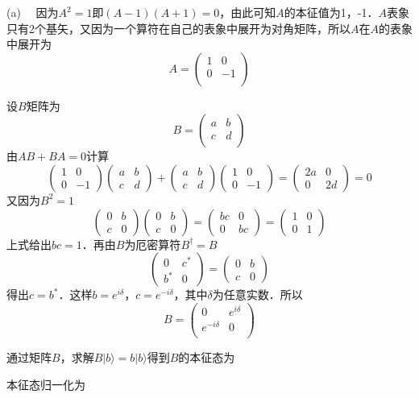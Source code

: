 (a) \ \ 因为$A^2=1$即$(A-1)(A+1)=0$，由此可知$A$的本征值为1，-1．$A$表象只有2个基矢，又因为一个算符在自己的表象中展开为对角矩阵，所以$A$在$A$的表象中展开为
$$
A=\left( \begin{matrix}
	1&		0\\
	0&		-1\\
\end{matrix} \right) 
$$

设$B$矩阵为
$$
B=\left( \begin{matrix}
	a&		b\\
	c&		d\\
\end{matrix} \right) 
$$
由$AB+BA=0$计算
$$
\left(\begin{array}{cc}
1 & 0 \\
0 & -1
\end{array}\right)\left(\begin{array}{ll}
a & b \\
c & d
\end{array}\right)+\left(\begin{array}{ll}
a & b \\
c & d
\end{array}\right)\left(\begin{array}{cc}
1 & 0 \\
0 & -1
\end{array}\right)=\left(\begin{array}{cc}
2 a & 0 \\
0 & 2 d
\end{array}\right)=0
$$
又因为$B^2=1$
$$
\left(\begin{array}{ll}
0 & b \\
c & 0
\end{array}\right)\left(\begin{array}{ll}
0 & b \\
c & 0
\end{array}\right)=\left(\begin{array}{ll}
b c & 0 \\
0 & b c
\end{array}\right)=\left(\begin{array}{ll}
1 & 0 \\
0 & 1
\end{array}\right)$$
上式给出$bc=1$．再由$B$为厄密算符$B^\dagger=B$
$$
\left(\begin{array}{ll}
0 & c^* \\
b^* & 0
\end{array}\right)=\left(\begin{array}{ll}
0 & b \\
c & 0
\end{array}\right)
$$
得出$c=b^*$．这样$b=e^{i\delta}$，$c=e^{-i\delta}$，其中$\delta$为任意实数．所以
$$
B=\left( \begin{matrix}
	0&		e^{i\delta}\\
	e^{-i\delta}&		0\\
\end{matrix} \right) 
$$

通过矩阵$B$，求解$B|b \rangle=b|b \rangle$得到$B$的本征态为

本征态归一化为
